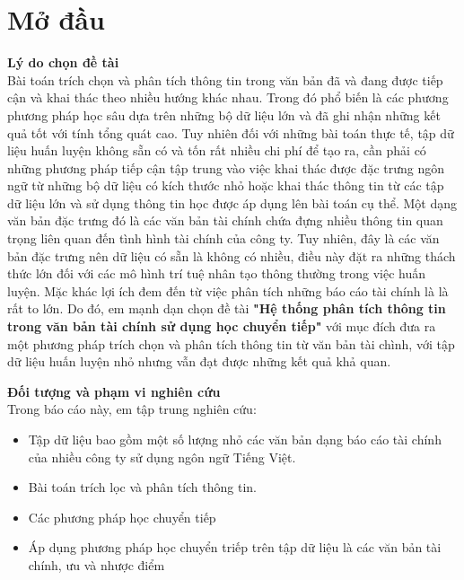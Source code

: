 \documentclass[14pt]{extreport}
\begin{document}





\tableofcontents


\newpage
\setcounter{page}{1}

\chapter*{Mở đầu}
 \textbf{Lý do chọn đề tài}\\
 
Bài toán trích chọn và phân tích thông tin trong văn bản đã và đang được tiếp cận và khai thác theo nhiều hướng khác nhau. Trong đó phổ biến là các phương phương pháp học sâu dựa trên những bộ dữ liệu lớn và đã ghi nhận những kết quả tốt với tính tổng quát cao. Tuy nhiên đối với những bài toán thực tế, tập dữ liệu huấn luyện không sẵn có và tốn rất nhiều chi phí để tạo ra, cần phải có những phương pháp tiếp cận tập trung vào việc khai thác được đặc trưng ngôn ngữ từ những bộ dữ liệu có kích thước nhỏ hoặc khai thác thông tin từ các tập dữ liệu lớn và sử dụng thông tin học được áp dụng lên bài toán cụ thể. Một dạng văn bản đặc trưng đó là các văn bản tài chính chứa đựng nhiều thông tin quan trọng liên quan đến tình hình tài chính của công ty. Tuy nhiên, đây là các văn bản đặc trưng nên dữ liệu có sẵn là không có nhiều, điều này đặt ra những thách thức lớn đối với các mô hình trí tuệ nhân tạo thông thường trong việc huấn luyện. Mặc khác lợi ích đem đến từ việc phân tích những báo cáo tài chính là là rất to lớn. Do đó, em mạnh dạn chọn đề tài \textbf{"Hệ thống phân tích thông tin trong văn bản tài chính sử dụng học chuyển tiếp"} với mục đích đưa ra một phương pháp trích chọn và phân tích thông tin từ văn bản tài chình, với tập dữ liệu huấn luyện nhỏ nhưng vẫn đạt được những kết quả khả quan.

\textbf{Đối tượng và phạm vi nghiên cứu}\\
Trong báo cáo này, em tập trung nghiên cứu:
\begin{itemize}
    \item Tập dữ liệu bao gồm một số lượng nhỏ các văn bản dạng báo cáo tài chính của nhiều công ty sử dụng ngôn ngữ Tiếng Việt.
    \item Bài toán trích lọc và phân tích thông tin.
    \item Các phương pháp học chuyển tiếp
    \item Áp dụng phương pháp học chuyển triếp trên tập dữ liệu là các văn bản tài chính, ưu và nhược điểm
\end{itemize}
\end{document}
